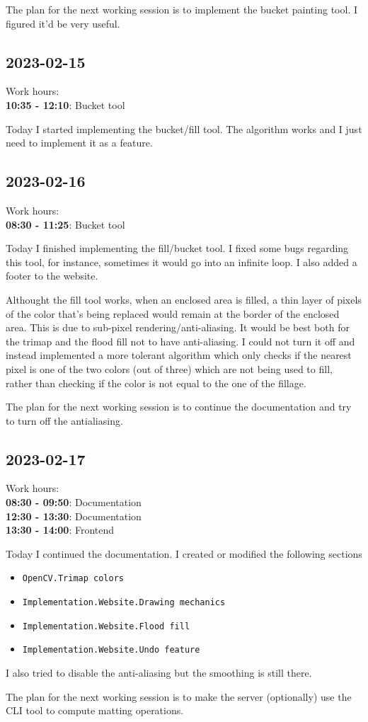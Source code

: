 \documentclass{article}
\begin{document}
The plan for the next working session is to implement the bucket painting tool.
I figured it'd be very useful.

\subsection{2023-02-15}

Work hours:\\
\textbf{10:35 - 12:10}: Bucket tool

Today I started implementing the bucket/fill tool.
The algorithm works and I just need to implement it
as a feature.

\pagebreak

\subsection{2023-02-16}

Work hours:\\
\textbf{08:30 - 11:25}: Bucket tool

Today I finished implementing the fill/bucket tool.
I fixed some bugs regarding this tool, for instance,
sometimes it would go into an infinite loop.
I also added a footer to the website.

Althought the fill tool works, when an enclosed area is filled,
a thin layer of pixels of the color that's being replaced
would remain at the border of the enclosed area.
This is due to sub-pixel rendering/anti-aliasing. It would be best both for the trimap
and the flood fill not to have anti-aliasing.
I could not turn it off and instead implemented a more tolerant
algorithm which only checks if the nearest pixel is
one of the two colors (out of three) which are not being
used to fill, rather than checking if the color is not equal
to the one of the fillage.

The plan for the next working session is to
continue the documentation and try to turn off the antialiasing.

\subsection{2023-02-17}

Work hours:\\
\textbf{08:30 - 09:50}: Documentation \\
\textbf{12:30 - 13:30}: Documentation \\
\textbf{13:30 - 14:00}: Frontend

Today I continued the documentation.
I created or modified the following sections
\begin{itemize}
    \item \texttt{OpenCV.Trimap colors}
    \item \texttt{Implementation.Website.Drawing mechanics}
    \item \texttt{Implementation.Website.Flood fill}
    \item \texttt{Implementation.Website.Undo feature}
\end{itemize}

I also tried to disable the anti-aliasing but the smoothing is still there.

The plan for the next working session is to make the server
(optionally) use the CLI tool to compute matting operations.
\end{document}
